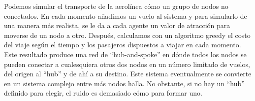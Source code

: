 \documentclass[a4paper, 11pt]{report}
\begin{document}
Podemos simular el transporte de la aerolínea cómo un grupo de nodos
no conectados. En cada momento añadimos un vuelo al sistema y para simularlo de una manera más realista, se le da a cada agente un
valor de atracción para moverse de un nodo a otro. Después, calculamos con un algoritmo greedy el costo del
viaje según el tiempo y los pasajeros dispuestos a viajar en cada momento. \\

Este resultado produce una red de ``hub-and-spoke'' en dónde todos los nodos se pueden conectar a cualesquiera otros dos nodos en un número limitado de vuelos, del origen al ``hub'' y de ahí a su destino. Este sistema eventualmente se convierte en un sistema complejo entre más nodos halla. No obstante, si no hay un ``hub''
definido para elegir, el ruido es demasiado cómo para formar uno.
\end{document}
